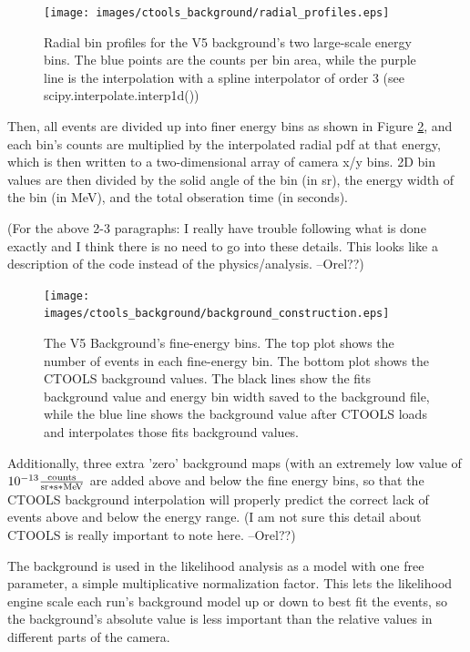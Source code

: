     \begin{figure}[ht]
      \centering
      \texttt{[image: images/ctools\_background/radial\_profiles.eps]}
      \caption[CTOOLS Radial Background Profiles]{
        Radial bin profiles for the V5 background's two large-scale energy bins.
        The blue points are the counts per bin area, while the purple line is the interpolation with a spline interpolator of order 3 (see scipy.interpolate.interp1d())
        }
      \label{fig:background_radial}
    \end{figure}


    Then, all events are divided up into  finer energy bins as shown in Figure \ref{fig:background_profile}, and each bin's counts are multiplied by the interpolated radial pdf at that energy, which is then written to a two-dimensional array of camera x/y bins.
    2D bin values are then divided by the solid angle of the bin (in sr), the energy width of the bin (in MeV), and the total obseration time (in seconds).

    (For the above 2-3 paragraphs: I really have trouble following what is done exactly and I think there is no need to go into these details. This looks like a description of the code instead of the physics/analysis. --Orel??)

    \begin{figure}[ht]
      \centering
      \texttt{[image: images/ctools\_background/background\_construction.eps]}
      \caption[CTOOLS Background Fine Energy Bins]{
        The V5 Background's fine-energy bins.
        The top plot shows the number of events in each fine-energy bin.
        The bottom plot shows the CTOOLS background values.
        The black lines show the fits background value and energy bin width saved to the background file, while the blue line shows the background value after CTOOLS loads and interpolates those fits background values.
      }
      \label{fig:background_profile}
    \end{figure}

    Additionally, three extra 'zero' background maps (with an extremely low value of $10^{-13} \frac{\text{counts}}{\text{sr}*\text{s}*\MeV}$ are added above and below the fine energy bins, so that the CTOOLS background interpolation will properly predict the correct lack of events above and below the energy range.
    (I am not sure this detail about CTOOLS is really important to note here. --Orel??)

    The background is used in the likelihood analysis as a model with one free parameter, a simple multiplicative normalization factor.
    This lets the likelihood engine scale each run's background model up or down to best fit the events, so the background's absolute value is less important than the relative values in different parts of the camera.

